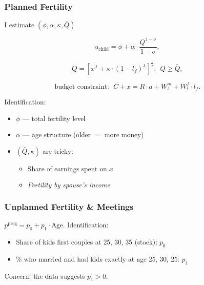 \documentclass{beamer}
\begin{document}
\begin{frame}
\frametitle{Planned Fertility}
I estimate $(\phi,\alpha,\kappa,\bar{Q})$

\[u_{\text{child}} = \phi + \alpha \cdot \frac{Q^{1-\sigma}}{1-\sigma},\]

\[Q = \left[x^{\lambda} + \kappa \cdot (1-l_f)^{\lambda}\right]^{\frac1{\lambda}}, \ \ Q\geq \bar{Q},\]

\[\text{budget constraint}: \ \ C + x = R\cdot a + W^m_t + W^f_t \cdot l_f.\]

Identification:
\begin{itemize}
\item $\phi$ --- total fertility level
\item $\alpha$ --- age structure (older $=$ more money)
\item $(\bar{Q},\kappa)$ are tricky:
\begin{itemize}
\item Share of earnings spent on $x$ 
\item \textit{Fertility by spouse's income}
\end{itemize}
\end{itemize}
\end{frame}

\begin{frame}
\frametitle{Unplanned Fertility \& Meetings}
$p^{\text{preg}} = p_0 + p_1\cdot \text{Age}$.
Identification:
\begin{itemize}
\item Share of kids first couples at 25, 30, 35 (stock): $p_0$
\item \% who married and had kids exactly at age 25, 30, 25: $p_1$
\end{itemize}
Concern: the data suggests $p_1>0$.
\end{frame}
\end{document}
